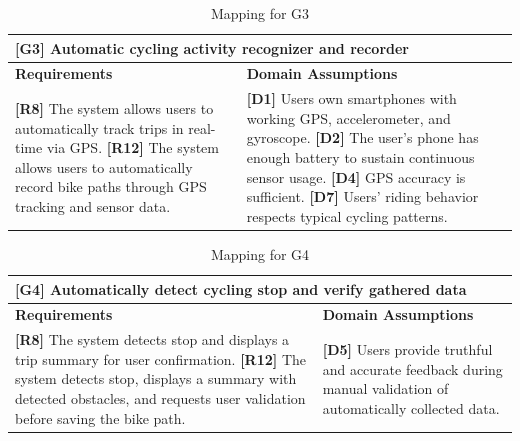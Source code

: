 \begin{table}[H]
    \centering
    \begin{tabular}{|p{7cm}|p{7cm}|}
        \hline
        \multicolumn{2}{|p{14cm}|}{\textbf{[G3]} Automatic cycling activity recognizer and recorder} \\
        \hline
        \textbf{Requirements} & \textbf{Domain Assumptions} \\
        \hline
        \textbf{[R8]} The system allows users to automatically track trips in real-time via GPS. \newline
        \textbf{[R12]} The system allows users to automatically record bike paths through GPS tracking and sensor data. & 
        \textbf{[D1]} Users own smartphones with working GPS, accelerometer, and gyroscope. \newline
        \textbf{[D2]} The user's phone has enough battery to sustain continuous sensor usage. \newline
        \textbf{[D4]} GPS accuracy is sufficient. \newline
        \textbf{[D7]} Users' riding behavior respects typical cycling patterns. \\
        \hline
    \end{tabular}
    \caption{Mapping for G3}
    \label{tab:map_g3}
\end{table}

\begin{table}[H]
    \centering
    \begin{tabular}{|p{7cm}|p{7cm}|}
        \hline
        \multicolumn{2}{|p{14cm}|}{\textbf{[G4]} Automatically detect cycling stop and verify gathered data} \\
        \hline
        \textbf{Requirements} & \textbf{Domain Assumptions} \\
        \hline
        \textbf{[R8]} The system detects stop and displays a trip summary for user confirmation. \newline
        \textbf{[R12]} The system detects stop, displays a summary with detected obstacles, and requests user validation before saving the bike path. & 
        \textbf{[D5]} Users provide truthful and accurate feedback during manual validation of automatically collected data. \\
        \hline
    \end{tabular}
    \caption{Mapping for G4}
    \label{tab:map_g4}
\end{table}

